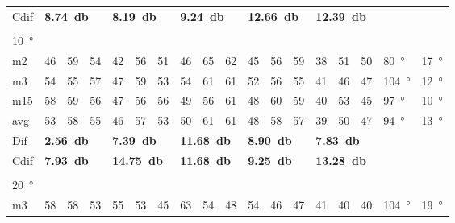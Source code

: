 \begin{table}[H]
\begin{tabular}{l|l|l|l|l|l|l|l|l|l|l|l|l|l|l|l|l|l}
Cdif & \multicolumn{3}{l|}{\textbf{\SI{8.74}{\decibel}}} & \multicolumn{3}{l|}{\textbf{\SI{8.19}{\decibel}}} & \multicolumn{3}{l|}{\textbf{\SI{9.24}{\decibel}}} & \multicolumn{3}{l|}{\textbf{\SI{12.66}{\decibel}}} & \multicolumn{3}{l|}{\textbf{\SI{12.39}{\decibel}}}  &   \multicolumn{2}{l}{}   \\ 
 \multicolumn{18}{l}{ } \\                             
\SI{10}{\degree}   & \multicolumn{3}{l|}{} & \multicolumn{3}{l|}{} & \multicolumn{3}{l|}{} & \multicolumn{3}{l|}{} &  \multicolumn{3}{l|}{}   &  \multicolumn{2}{l}{} \\  \hline
m2    &  46    &  59    &  54    &  42    &  56    &   51   &  46    &   65    &   62   &   45    &  56    &  59    & 38 & 51 &50   & \SI{80}{\degree} & \SI{17}{\degree} \\
m3    &  54    &  55    &  57    &   47   &  59    &   53   &   54   &  61     &   61   &   52    & 56     &  55    & 41 & 46 &47  & \SI{104}{\degree} & \SI{12}{\degree} \\
m15  &  58    &  59    &  56    &  47    & 56     &   56   &   49   &   56    &   61   &    48   &   60   &  59    & 40 & 53 &45   & \SI{97}{\degree} & \SI{10}{\degree}\\ \hline
avg &  53    & 58     & 55     & 46     &   57   & 53     &  50    &  61     &  61    &  48     & 58     & 57     & 39 & 50 &  47 & \SI{94}{\degree} & \SI{13}{\degree} \\ \hline  
Dif & \multicolumn{3}{l|}{\textbf{\SI{2.56}{\decibel}}} & \multicolumn{3}{l|}{\textbf{\SI{7.39}{\decibel}}} & \multicolumn{3}{l|}{\textbf{\SI{11.68}{\decibel}}} & \multicolumn{3}{l|}{\textbf{\SI{8.90}{\decibel}}} & \multicolumn{3}{l|}{\textbf{\SI{7.83}{\decibel}}} &  \multicolumn{2}{l}{} \\     \hline 
Cdif & \multicolumn{3}{l|}{\textbf{\SI{7.93}{\decibel}}} & \multicolumn{3}{l|}{\textbf{\SI{14.75}{\decibel}}} & \multicolumn{3}{l|}{\textbf{\SI{11.68}{\decibel}}} & \multicolumn{3}{l|}{\textbf{\SI{9.25}{\decibel}}} & \multicolumn{3}{l|}{\textbf{\SI{13.28}{\decibel}}}  &   \multicolumn{2}{l}{}   \\  
\multicolumn{18}{l}{ } \\                
\SI{20}{\degree}   & \multicolumn{3}{l|}{} & \multicolumn{3}{l|}{} & \multicolumn{3}{l|}{} & \multicolumn{3}{l|}{} &  \multicolumn{3}{l|}{}   &  \multicolumn{2}{l}{} \\  \hline
m3    &  58    &  58    &  53    &  55    &  53    &  45    &   63   &    54   &  48    &  54     &  46    &  47    & 41 & 40 &40  & \SI{104}{\degree} & \SI{19}{\degree}  \\

\end{tabular}
\end{table}
